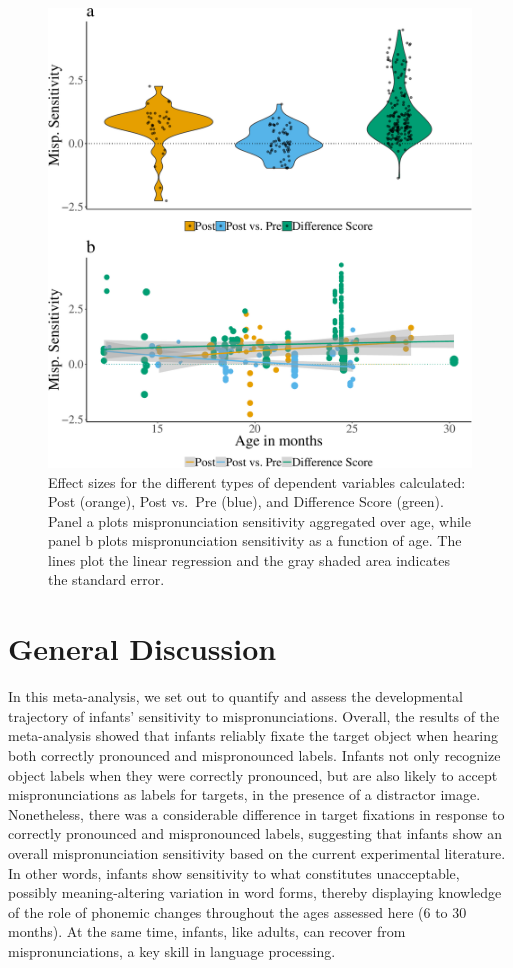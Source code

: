 \documentclass[man]{apa6}
\theoremstyle{definition}
\theoremstyle{definition}
\theoremstyle{definition}
\theoremstyle{remark}
\begin{document}
\begin{figure}
\centering
\includegraphics{VonHolzenBergmann_MPMetaAnalysis_files/figure-latex/Plot-Within-cond-age-diff-score-1.pdf}
\caption{\label{fig:Plot-Within-cond-age-diff-score}Effect sizes for the
different types of dependent variables calculated: Post (orange), Post
vs.~Pre (blue), and Difference Score (green). Panel a plots
mispronunciation sensitivity aggregated over age, while panel b plots
mispronunciation sensitivity as a function of age. The lines plot the
linear regression and the gray shaded area indicates the standard
error.}
\end{figure}

\section{General Discussion}\label{general-discussion}

In this meta-analysis, we set out to quantify and assess the
developmental trajectory of infants' sensitivity to mispronunciations.
Overall, the results of the meta-analysis showed that infants reliably
fixate the target object when hearing both correctly pronounced and
mispronounced labels. Infants not only recognize object labels when they
were correctly pronounced, but are also likely to accept
mispronunciations as labels for targets, in the presence of a distractor
image. Nonetheless, there was a considerable difference in target
fixations in response to correctly pronounced and mispronounced labels,
suggesting that infants show an overall mispronunciation sensitivity
based on the current experimental literature. In other words, infants
show sensitivity to what constitutes unacceptable, possibly
meaning-altering variation in word forms, thereby displaying knowledge
of the role of phonemic changes throughout the ages assessed here (6 to
30 months). At the same time, infants, like adults, can recover from
mispronunciations, a key skill in language processing.
\end{document}
